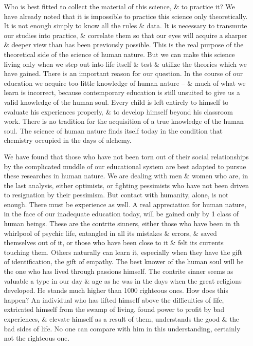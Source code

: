 \documentclass{article}
\begin{document}
Who is best fitted to collect the material of this science, \& to practice it? We have already noted that it is impossible to practice this science only theoretically. It is not enough simply to know all the rules \& data. It is necessary to transmute our studies into practice, \& correlate them so that our eyes will acquire a sharper \& deeper view than has been previously possible. This is the real purpose of the theoretical side of the science of human nature. But we can make this science living only when we step out into life itself \& test \& utilize the theories which we have gained. There is an important reason for our question. In the course of our education we acquire too little knowledge of human nature -- \& much of what we learn is incorrect, because contemporary education is still unsuited to give us a valid knowledge of the human soul. Every child is left entirely to himself to evaluate his experiences properly, \& to develop himself beyond his classroom work. There is no tradition for the acquisition of a true knowledge of the human soul. The science of human nature finds itself today in the condition that chemistry occupied in the days of alchemy.

We have found that those who have not been torn out of their social relationships by the complicated muddle of our educational system are best adapted to pursue these researches in human nature. We are dealing with men \& women who are, in the last analysis, either optimists, or fighting pessimists who have not been driven to resignation by their pessimism. But contact with humanity, alone, is not enough. There must be experience as well. A real appreciation for human nature, in the face of our inadequate education today, will be gained only by 1 class of human beings. These are the contrite sinners, either those who have been in th whirlpool of psychic life, entangled in all its mistakes \& errors, \& saved themselves out of it, or those who have been close to it \& felt its currents touching them. Others naturally can learn it, especially when they have the gift of identification, the gift of empathy. The best knower of the human soul will be the one who has lived through passions himself. The contrite sinner seems as valuable a type in our day \& age as he was in the days when the great religions developed. He stands much higher than 1000 righteous ones. How does this happen? An individual who has lifted himself above the difficulties of life, extricated himself from the swamp of living, found power to profit by bad experiences, \& elevate himself as a result of them, understands the good \& the bad sides of life. No one can compare with him in this understanding, certainly not the righteous one.
\end{document}
